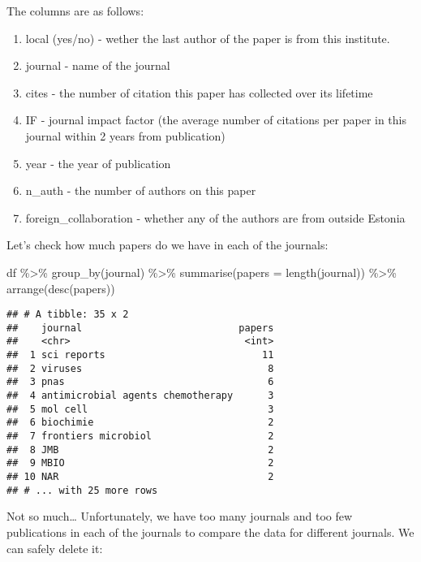 \documentclass[
]{article}
\newenvironment{Shaded}{\begin{snugshade}}{\end{snugshade}}
\newcommand{\AttributeTok}[1]{\textcolor[rgb]{0.77,0.63,0.00}{#1}}
\newcommand{\FunctionTok}[1]{\textcolor[rgb]{0.00,0.00,0.00}{#1}}
\newcommand{\NormalTok}[1]{#1}
\newcommand{\SpecialCharTok}[1]{\textcolor[rgb]{0.00,0.00,0.00}{#1}}
\providecommand{\tightlist}{%
  \setlength{\itemsep}{0pt}\setlength{\parskip}{0pt}}
\begin{document}
The columns are as follows:

\begin{enumerate}
\def\labelenumi{\arabic{enumi}.}
\tightlist
\item
  local (yes/no) - wether the last author of the paper is from this
  institute.
\item
  journal - name of the journal
\item
  cites - the number of citation this paper has collected over its
  lifetime
\item
  IF - journal impact factor (the average number of citations per paper
  in this journal within 2 years from publication)
\item
  year - the year of publication
\item
  n\_auth - the number of authors on this paper
\item
  foreign\_collaboration - whether any of the authors are from outside
  Estonia
\end{enumerate}

Let's check how much papers do we have in each of the journals:

\begin{Shaded}
\begin{Highlighting}[]
\NormalTok{df }\SpecialCharTok{\%\textgreater{}\%}
  \FunctionTok{group\_by}\NormalTok{(journal) }\SpecialCharTok{\%\textgreater{}\%}
  \FunctionTok{summarise}\NormalTok{(}\AttributeTok{papers =} \FunctionTok{length}\NormalTok{(journal)) }\SpecialCharTok{\%\textgreater{}\%}
  \FunctionTok{arrange}\NormalTok{(}\FunctionTok{desc}\NormalTok{(papers))}
\end{Highlighting}
\end{Shaded}

\begin{verbatim}
## # A tibble: 35 x 2
##    journal                           papers
##    <chr>                              <int>
##  1 sci reports                           11
##  2 viruses                                8
##  3 pnas                                   6
##  4 antimicrobial agents chemotherapy      3
##  5 mol cell                               3
##  6 biochimie                              2
##  7 frontiers microbiol                    2
##  8 JMB                                    2
##  9 MBIO                                   2
## 10 NAR                                    2
## # ... with 25 more rows
\end{verbatim}

Not so much\ldots{} Unfortunately, we have too many journals and too few
publications in each of the journals to compare the data for different
journals. We can safely delete it:
\end{document}
